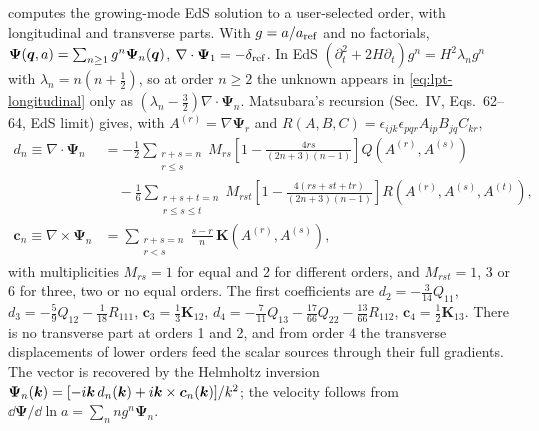  computes the growing-mode EdS solution to a user-selected order, with longitudinal and
transverse parts. With $g=a/a_{\rm ref}$ and no factorials,
$\bm\Psi(\bm{q},a)=\sum_{n\ge1}g^n\bm\Psi_n(\bm{q})$, $\nabla\cdot\bm\Psi_1=-\delta_{\rm ref}$. In EdS
$(\partial_t^2+2H\partial_t)g^n=H^2\lambda_ng^n$ with $\lambda_n=n(n+\frac12)$, so at order $n\ge2$ the unknown appears
in \cref{eq:lpt-longitudinal} only as $(\lambda_n-\frac32)\nabla\cdot\bm\Psi_n$. Matsubara's recursion
\cite{Matsubara2015} (Sec.~IV, Eqs.~62--64, EdS limit) gives, with $A^{(r)}=\nabla\bm\Psi_r$ and
$R(A,B,C)=\epsilon_{ijk}\epsilon_{pqr}A_{ip}B_{jq}C_{kr}$,
\begin{align}
d_n\equiv\nabla\cdot\bm\Psi_n&=-\frac12\sum_{\substack{r+s=n\\ r\le s}}M_{rs}
\left[1-\frac{4rs}{(2n+3)(n-1)}\right]Q(A^{(r)},A^{(s)})\nonumber\\
&\quad-\frac16\sum_{\substack{r+s+t=n\\ r\le s\le t}}M_{rst}\left[1-\frac{4(rs+st+tr)}{(2n+3)(n-1)}\right]
R(A^{(r)},A^{(s)},A^{(t)}),\\
\bm c_n\equiv\nabla\times\bm\Psi_n&=\sum_{\substack{r+s=n\\ r<s}}\frac{s-r}{n}\,\bm K(A^{(r)},A^{(s)}),
\end{align}
with multiplicities $M_{rs}=1$ for equal and 2 for different orders, and $M_{rst}=1$, 3 or 6 for three, two or no equal
orders. The first coefficients are $d_2=-\frac3{14}Q_{11}$, $d_3=-\frac59Q_{12}-\frac1{18}R_{111}$,
$\bm c_3=\frac13\bm K_{12}$, $d_4=-\frac7{11}Q_{13}-\frac{17}{66}Q_{22}-\frac{13}{66}R_{112}$, $\bm c_4=\frac12\bm K_{13}$.
There is no transverse part at orders 1 and 2, and from order 4 the transverse displacements of lower orders feed the
scalar sources through their full gradients. The vector is recovered by the Helmholtz inversion
$\bm\Psi_n(\bm{k})=[-i\bm{k}\,d_n(\bm{k})+i\bm{k}\times\bm c_n(\bm{k})]/k^2$; the velocity follows from
$\dd\bm\Psi/\dd\ln a=\sum_nng^n\bm\Psi_n$.

